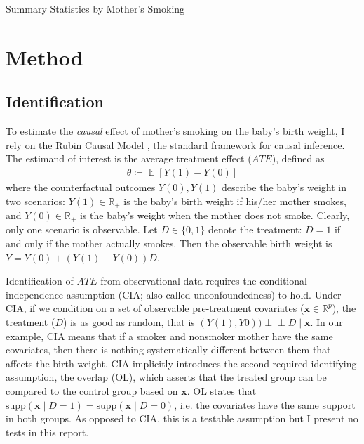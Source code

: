 \documentclass[a4paper,12pt]{article}
\DeclareMathOperator*{\E}{\mathbb{E}}
\newcommand{\Eb}[1]{\E\left[#1\right]}
\newcommand{\indep}{\rotatebox[origin=c]{90}{$\models$}}
\renewcommand{\indep}{\!\perp\!\!\!\perp}
\newcommand{\ceq}{\coloneqq}  %
\newcommand{\real}{\mathbb{R}}
\newcommand{\posreal}{\mathbb{R}_+}
\newcommand{\dummy}{\{0,1\}}
\newcommand{\supp}{\text{supp}}
\begin{document}
\begin{table}[h!]
\centering
\caption{Summary Statistics by Mother's Smoking}
\label{tab:sum_stat}

\end{table}


\section{Method}

\subsection{Identification}


\noindent To estimate the \textit{causal} effect of mother's smoking on the baby's birth weight, I rely on the Rubin Causal Model \citep{rubin1974}, the standard framework for causal inference. The estimand of interest is the average treatment effect ($ATE$), defined as
\begin{align*}
\theta \ceq \Eb{Y(1)-Y(0)}
\end{align*} 
where the counterfactual outcomes $Y(0), Y(1)$ describe the baby's weight in two scenarios: $Y(1)\in\posreal$ is the baby's birth weight if his/her mother smokes, and $Y(0)\in\posreal$ is the baby's weight when the mother does not smoke. Clearly, only one scenario is observable.
Let $D\in\dummy$ denote the treatment: $D=1$ if and only if the mother actually smokes. Then the observable birth weight is $Y=Y(0)+(Y(1)-Y(0))D$.

Identification of $ATE$ from observational data requires the conditional independence assumption (CIA; also called unconfoundedness) to hold. Under CIA, if we condition on a set of observable pre-treatment covariates ($\bm{x}\in\real^p$), the treatment ($D$) is as good as random, that is $(Y(1), Y0))\indep D \mid \bm{x}$. In our example, CIA means that if a smoker and nonsmoker mother have the same covariates, then there is nothing systematically different between them that affects the birth weight. CIA implicitly introduces the second required identifying assumption, the overlap (OL), which asserts that the treated group can be compared to the control group based on $\bm{x}$. OL states that $\supp(\bm{x}\mid D=1)=\supp(\bm{x}\mid D=0)$, i.e. the covariates have the same support in both groups. As opposed to CIA, this is a testable assumption but I present no tests in this report.
\end{document}
